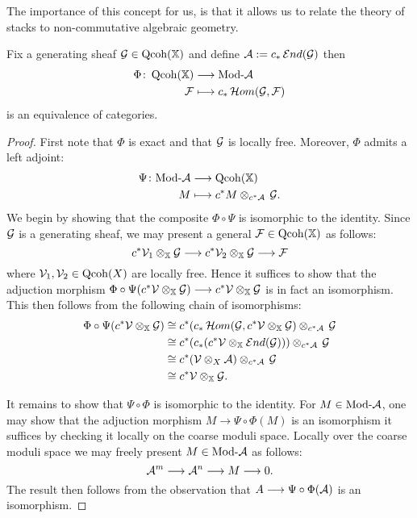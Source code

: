 \documentclass[12pt]{amsart}
\begin{document}
The importance of this concept for us, is that it allows us to relate the theory of stacks to non-commutative algebraic geometry. 
\begin{proposition} \label{prop:Morita}
Fix a generating sheaf $\mathcal{G} \in \operatorname{Qcoh}(\mathbb{X})$ and define $\mathcal{A} := c_* \mathop{{\mathcal{E}}nd}\nolimits (\mathcal{G})$ then 
\begin{align*}
\Phi \colon \operatorname{Qcoh} (\mathbb{X}) &\longrightarrow \textup{Mod-}\mathcal{A} \\
 \mathcal{F} & \longmapsto c_* \mathop{{\mathcal{H}}om}\nolimits(\mathcal{G}, \mathcal{F})
\end{align*}
is an equivalence of categories.
\end{proposition}

\begin{proof}
First note that $\Phi$ is exact and that $\mathcal{G}$ is locally free. Moreover, $\Phi$ admits a left adjoint:
\begin{align*}
\Psi \colon \textup{Mod-}\mathcal{A} &\longrightarrow \operatorname{Qcoh} (\mathbb{X}) \\
 M & \longmapsto c^*M \otimes_{c^* \mathcal{A}} \, \mathcal{G}.
\end{align*}
We begin by showing that the composite $\Phi \circ \Psi$ is isomorphic to the identity. 
Since $\mathcal{G}$ is a generating sheaf, we may present a general $\mathcal{F} \in \operatorname{Qcoh}(\mathbb{X})$ as follows: $$c^* \mathcal{V}_1 \otimes_{\mathbb{X}} \mathcal{G} \longrightarrow c^* \mathcal{V}_2 \otimes_{\mathbb{X}} \mathcal{G} \longrightarrow \mathcal{F}$$ where $\mathcal{V}_1, \mathcal{V}_2 \in \operatorname{Qcoh}(X)$ are locally free. 
Hence it suffices to show that the adjuction morphism $\Phi \circ \Psi (c^* \mathcal{V} \otimes_{\mathbb{X}} \mathcal{G}) \longrightarrow c^* \mathcal{V} \otimes_{\mathbb{X}} \mathcal{G}$ is in fact an isomorphism.
This then follows from the following chain of isomorphisms:
\begin{align*}
\Phi \circ \Psi (c^* \mathcal{V} \otimes_{\mathbb{X}} \mathcal{G}) &\cong c^*(c_* \mathop{{\mathcal{H}}om}\nolimits(\mathcal{G}, c^* \mathcal{V} \otimes_{\mathbb{X}} \mathcal{G}) \otimes_{c^* \mathcal{A}} \, \mathcal{G} \\
& \cong c^*(c_* (c^* \mathcal{V} \otimes_{\mathbb{X}} \mathop{{\mathcal{E}}nd}\nolimits(\mathcal{G}))) \otimes_{c^* \mathcal{A}} \, \mathcal{G} \\
& \cong c^* (\mathcal{V} \otimes_X \mathcal{A}) \otimes_{c^* \mathcal{A}} \, \mathcal{G} \\
& \cong c^*\mathcal{V} \otimes_{\mathbb{X}} \mathcal{G}.
\end{align*}

It remains to show that $\Psi \circ \Phi$ is isomorphic to the identity.
For $M \in \textup{Mod-}\mathcal{A}$, one may show that the adjuction morphism $M \rightarrow \Psi \circ \Phi(M)$ is an isomorphism it suffices by checking it locally on the coarse moduli space. 
Locally over the coarse moduli space we may freely present $M \in \textup{Mod-}\mathcal{A}$ as follows: $$\mathcal{A}^m \longrightarrow \mathcal{A}^n \longrightarrow M \longrightarrow 0.$$ 
The result then follows from the observation that $A \longrightarrow \Psi \circ \Phi (\mathcal{A})$ is an isomorphism.
\end{proof}
\end{document}
